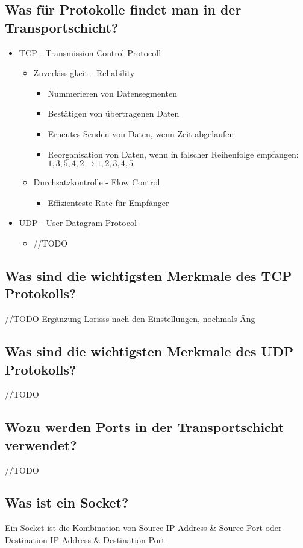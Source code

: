 \subsection*{Was für Protokolle findet man in der Transportschicht?}
\begin{itemize}
    \item TCP - Transmission Control Protocoll
    \begin{itemize}
        \item Zuverlässigkeit - Reliability
        \begin{itemize}
            \item Nummerieren von Datensegmenten
            \item Bestätigen von übertragenen Daten
            \item Erneutes Senden von Daten, wenn Zeit abgelaufen
            \item Reorganisation von Daten, wenn in falscher Reihenfolge empfangen: $1,3,5,4,2 \rightarrow 1,2,3,4,5$
        \end{itemize}
        \item Durchsatzkontrolle - Flow Control
        \begin{itemize}
            \item Effizienteste Rate für Empfänger
        \end{itemize}
    \end{itemize}
    \item UDP - User Datagram Protocol
    \begin{itemize}
        \item //TODO
    \end{itemize}
\end{itemize}
\subsection*{Was sind die wichtigsten Merkmale des TCP Protokolls?}
//TODO
Ergänzung Lorisss nach den Einstellungen, nochmals Äng
\subsection*{Was sind die wichtigsten Merkmale des UDP Protokolls?}
//TODO
\subsection*{Wozu werden Ports in der Transportschicht verwendet?}
//TODO
\subsection*{Was ist ein Socket?}
Ein Socket ist die Kombination von Source IP Address \& Source Port oder Destination IP Address \& Destination Port
